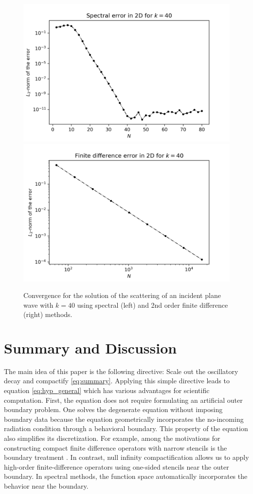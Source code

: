\documentclass[draft,onefignum,onetabnum]{siamart190516}
\begin{document}
\begin{figure}[tbhp]
	\centering
	\includegraphics[scale=0.41]{figs/spectral_2d.png}
	\includegraphics[scale=0.41]{figs/fd_2d.png}
	\caption{Convergence for the solution of the scattering of an incident plane wave with $k=40$ using spectral (left) and 2nd order finite difference (right) methods. }
	\label{fig:twod_scattering}
\end{figure}

\section{Summary and Discussion}
The main idea of this paper is the following directive: Scale out the oscillatory decay and compactify \eqref{eq:summary}. Applying this simple directive leads to equation \eqref{eq:hyp_general} which has various advantages for scientific computation. First, the equation does not require formulating an artificial outer boundary problem. One solves the degenerate equation without imposing boundary data because the equation geometrically incorporates the no-incoming radiation condition through a behavioral boundary. This property of the equation also simplifies its discretization. For example, among the motivations for constructing compact finite difference operators with narrow stencils is the boundary treatment \cite{britt2010compact}. In contrast, null infinity compactification allows us to apply high-order finite-difference operators using one-sided stencils near the outer boundary. In spectral methods, the function space automatically incorporates the behavior near the boundary.
\end{document}
